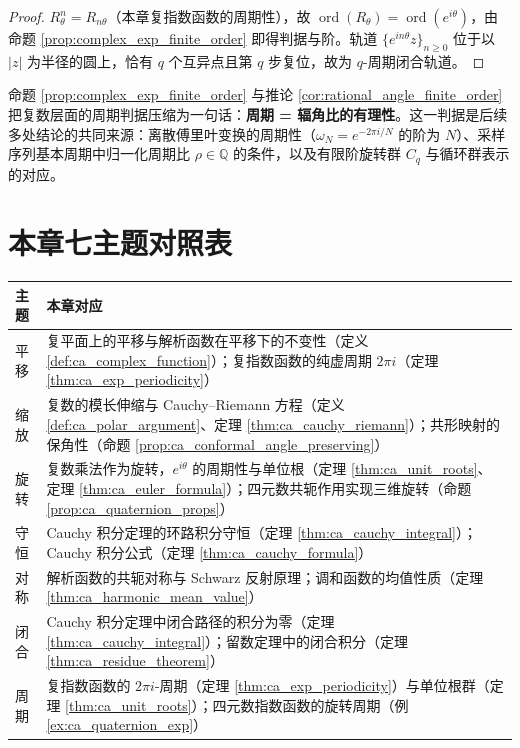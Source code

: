 \begin{proof}
$R_\theta^n=R_{n\theta}$（本章复指数函数的周期性），故 $\operatorname{ord}(R_\theta)=\operatorname{ord}(e^{i\theta})$，由命题 \ref{prop:complex_exp_finite_order} 即得判据与阶。轨道 $\{e^{in\theta}z\}_{n\ge0}$ 位于以 $|z|$ 为半径的圆上，恰有 $q$ 个互异点且第 $q$ 步复位，故为 $q$-周期闭合轨道。
\end{proof}

\begin{remark}[与「周期」主题的接口]\label{rem:complex_period_interface}
命题 \ref{prop:complex_exp_finite_order} 与推论 \ref{cor:rational_angle_finite_order} 把复数层面的周期判据压缩为一句话：\textbf{周期 = 辐角比的有理性}。这一判据是后续多处结论的共同来源：离散傅里叶变换的周期性（$\omega_N=e^{-2\pi i/N}$ 的阶为 $N$）、采样序列基本周期中归一化周期比 $\rho\in\mathbb{Q}$ 的条件，以及有限阶旋转群 $C_q$ 与循环群表示的对应。
\end{remark}


\section*{本章七主题对照表}

\begin{center}
\renewcommand{\arraystretch}{1.3}
\begin{tabular}{>{\centering\arraybackslash}p{2.2cm}>{\centering\arraybackslash}p{10.5cm}}
\toprule
主题 & 本章对应 \\
\midrule
平移 & 复平面上的平移与解析函数在平移下的不变性（定义 \ref{def:ca_complex_function}）；复指数函数的纯虚周期 $2\pi i$（定理 \ref{thm:ca_exp_periodicity}） \\
缩放 & 复数的模长伸缩与 Cauchy--Riemann 方程（定义 \ref{def:ca_polar_argument}、定理 \ref{thm:ca_cauchy_riemann}）；共形映射的保角性（命题 \ref{prop:ca_conformal_angle_preserving}） \\
旋转 & 复数乘法作为旋转，$e^{i\theta}$ 的周期性与单位根（定理 \ref{thm:ca_unit_roots}、定理 \ref{thm:ca_euler_formula}）；四元数共轭作用实现三维旋转（命题 \ref{prop:ca_quaternion_props}） \\
守恒 & Cauchy 积分定理的环路积分守恒（定理 \ref{thm:ca_cauchy_integral}）；Cauchy 积分公式（定理 \ref{thm:ca_cauchy_formula}） \\
对称 & 解析函数的共轭对称与 Schwarz 反射原理；调和函数的均值性质（定理 \ref{thm:ca_harmonic_mean_value}） \\
闭合 & Cauchy 积分定理中闭合路径的积分为零（定理 \ref{thm:ca_cauchy_integral}）；留数定理中的闭合积分（定理 \ref{thm:ca_residue_theorem}） \\
周期 & 复指数函数的 $2\pi i$-周期（定理 \ref{thm:ca_exp_periodicity}）与单位根群（定理 \ref{thm:ca_unit_roots}）；四元数指数函数的旋转周期（例 \ref{ex:ca_quaternion_exp}） \\
\bottomrule
\end{tabular}
\end{center}


